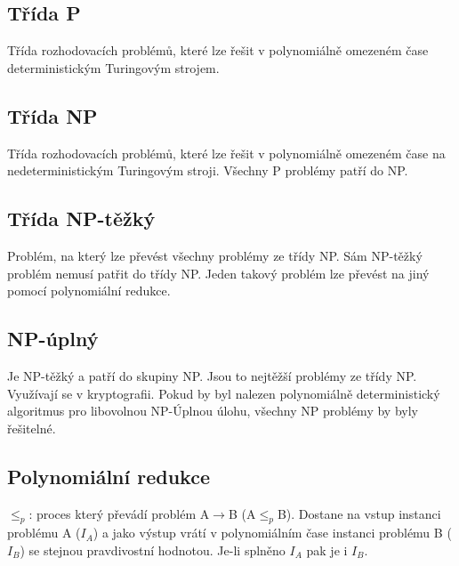 \documentclass{szzclass}
\begin{document}
\subsection{Třída P}
Třída rozhodovacích problémů, které lze řešit v polynomiálně omezeném čase deterministickým Turingovým strojem.
\subsection{Třída NP}
Třída rozhodovacích problémů, které lze řešit v polynomiálně omezeném čase na nedeterministickým Turingovým stroji.
Všechny P problémy patří do NP.
\subsection{Třída NP-těžký}
Problém, na který lze převést všechny problémy ze třídy NP. Sám NP-těžký problém nemusí patřit do třídy NP.
Jeden takový problém lze převést na jiný pomocí polynomiální redukce.
\subsection{NP-úplný}
Je NP-těžký a patří do skupiny NP. Jsou to nejtěžší problémy ze třídy NP. Využívají se v kryptografii.
\newline
Pokud by byl nalezen polynomiálně deterministický algoritmus pro libovolnou NP-Úplnou úlohu, všechny NP problémy by byly řešitelné.
\subsection{Polynomiální redukce}
$\leq_p$: proces který převádí problém A$\rightarrow$B (A$\leq_p$B). Dostane na vstup instanci problému A ($I_A$) a jako výstup vrátí v polynomiálním čase instanci problému B ($I_B$)
se stejnou pravdivostní hodnotou. Je-li splněno $I_A$ pak je i $I_B$.
\end{document}
